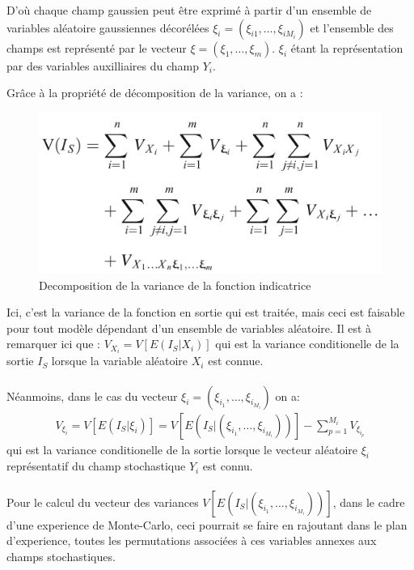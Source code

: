 \documentclass[a4paper,10pt]{article}
\begin{document}
D'où chaque champ gaussien peut être exprimé à partir d'un ensemble de variables aléatoire gaussiennes décorélées $\xi_{i}=(\xi_{i1},\ldots,\xi_{iM_{i}})$ et l'ensemble des champs est représenté par le vecteur $\xi=(\xi_{1},\ldots,\xi_{m})$. $\xi_{i}$ étant la représentation par des variables auxilliaires du champ $Y_{i}$. 

Grâce à la propriété de décomposition de la variance, on a :

\begin{figure}[H]
   \centering   
   \includegraphics[scale=0.175]{DecompositionVariance.png}
      \caption{Decomposition de la variance de la fonction indicatrice}
         \label{VarDecompo}
\end{figure}

Ici, c'est la variance de la fonction en sortie qui est traitée, mais ceci est faisable pour tout modèle dépendant d'un ensemble de variables aléatoire. Il est à remarquer ici que : 
$V_{X_{i}} = V\left[E\left(I_{S}|X_{i}\right)\right]$ qui est la variance conditionelle de la sortie $I_{S}$ lorsque la variable aléatoire $X_{i}$ est connue. \\ 
\\
Néanmoins, dans le cas du vecteur $\xi_{i} = (\xi_{i_{1}},\ldots,\xi_{i_{M_{i}}})$ on a: \\
\begin{eqnarray}
V_{\xi_{i}} = V\left[E\left(I_{S}|\xi_{i}\right)\right] = V\left[E\left(I_{S}|(\xi_{i_{1}},\ldots,\xi_{i_{M_{i}}})\right)\right] - \sum_{p=1}^{M_{i}}V_{\xi_{i_{p}}}
\end{eqnarray}
qui est la variance conditionelle de la sortie lorsque le vecteur aléatoire $\xi_{i}$ représentatif du champ stochastique $Y_{i}$ est connu.\\
\\  
Pour le calcul du vecteur des variances $V\left[E\left(I_{S}|(\xi_{i_{1}},\ldots,\xi_{i_{M_{i}}})\right)\right]$, dans le cadre d'une experience de Monte-Carlo, ceci pourrait se faire en rajoutant dans le plan d'experience, toutes les permutations associées à ces variables annexes aux champs stochastiques.
\end{document}
